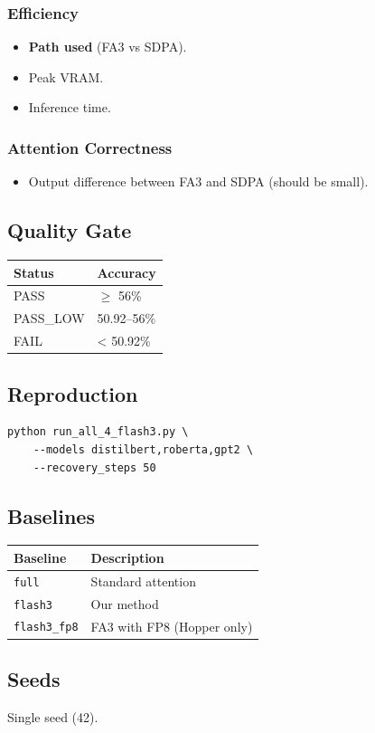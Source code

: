 \subsubsection{Efficiency}
\begin{itemize}
\item \textbf{Path used} (FA3 vs SDPA).
\item Peak VRAM.
\item Inference time.

\end{itemize}
\subsubsection{Attention Correctness}
\begin{itemize}
\item Output difference between FA3 and SDPA (should be small).

\end{itemize}
\subsection{Quality Gate}

\begin{table}[H]
\centering
\small
\begin{tabular}{ll}
\toprule
\textbf{Status} & \textbf{Accuracy} \\
\midrule
PASS & $\ge$ 56\% \\
PASS\_LOW & 50.92--56\% \\
FAIL & < 50.92\% \\
\bottomrule
\end{tabular}
\end{table}

\subsection{Reproduction}

\begin{lstlisting}
python run_all_4_flash3.py \
    --models distilbert,roberta,gpt2 \
    --recovery_steps 50
\end{lstlisting}

\subsection{Baselines}

\begin{table}[H]
\centering
\small
\begin{tabular}{ll}
\toprule
\textbf{Baseline} & \textbf{Description} \\
\midrule
\texttt{full} & Standard attention \\
\texttt{flash3} & Our method \\
\texttt{flash3\_fp8} & FA3 with FP8 (Hopper only) \\
\bottomrule
\end{tabular}
\end{table}

\subsection{Seeds}

Single seed (42).

